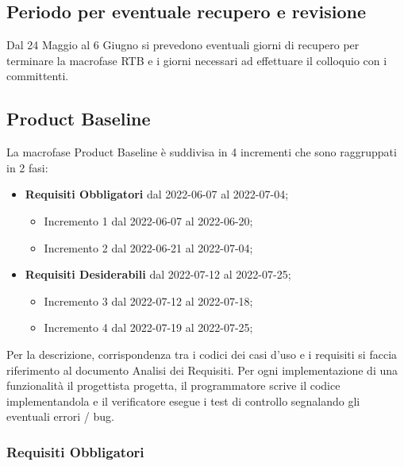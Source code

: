 \subsection*{Periodo per eventuale recupero e revisione}
Dal 24 Maggio al 6 Giugno si prevedono eventuali giorni di recupero per terminare la macrofase RTB e i giorni necessari ad effettuare il colloquio con i committenti.

\subsection{Product Baseline}
La macrofase Product Baseline è suddivisa in 4 incrementi che sono raggruppati in 2 fasi:
\begin{itemize}
    \item \textbf{Requisiti Obbligatori} dal 2022-06-07 al 2022-07-04;
            \begin{itemize}
                \item Incremento 1 dal 2022-06-07 al 2022-06-20;
                \item Incremento 2 dal 2022-06-21 al 2022-07-04;
            \end{itemize}
    \item \textbf{Requisiti Desiderabili} dal 2022-07-12 al 2022-07-25;
            \begin{itemize}
                \item Incremento 3 dal 2022-07-12 al 2022-07-18;
                \item Incremento 4 dal 2022-07-19 al 2022-07-25;
            \end{itemize}
\end{itemize}
Per la descrizione, corrispondenza tra i codici dei casi d'uso e i requisiti si faccia riferimento al documento Analisi dei Requisiti. \newline
Per ogni implementazione di una funzionalità il progettista progetta, il programmatore scrive il codice implementandola e il verificatore esegue i test di controllo segnalando gli eventuali errori / bug.
\subsubsection{Requisiti Obbligatori}
